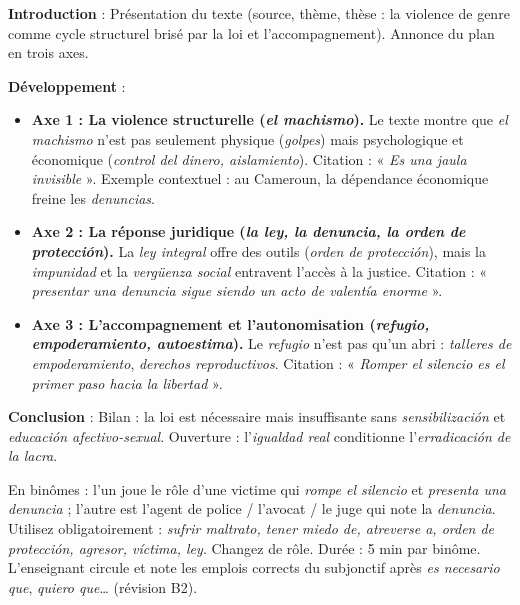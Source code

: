 \documentclass[11pt]{article}
\begin{document}
\begin{exemplebox}
\textbf{Introduction} : Présentation du texte (source, thème, thèse : la violence de genre comme cycle structurel brisé par la loi et l'accompagnement). Annonce du plan en trois axes.

\textbf{Développement} :
\begin{itemize}
\item \textbf{Axe 1 : La violence structurelle (\emph{el machismo}).} Le texte montre que \emph{el machismo} n'est pas seulement physique (\emph{golpes}) mais psychologique et économique (\emph{control del dinero, aislamiento}). Citation : « \emph{Es una jaula invisible} ». Exemple contextuel : au Cameroun, la dépendance économique freine les \emph{denuncias}.
\item \textbf{Axe 2 : La réponse juridique (\emph{la ley, la denuncia, la orden de protección}).} La \emph{ley integral} offre des outils (\emph{orden de protección}), mais la \emph{impunidad} et la \emph{vergüenza social} entravent l'accès à la justice. Citation : « \emph{presentar una denuncia sigue siendo un acto de valentía enorme} ».
\item \textbf{Axe 3 : L'accompagnement et l'autonomisation (\emph{refugio, empoderamiento, autoestima}).} Le \emph{refugio} n'est pas qu'un abri : \emph{talleres de empoderamiento}, \emph{derechos reproductivos}. Citation : « \emph{Romper el silencio es el primer paso hacia la libertad} ».
\end{itemize}

\textbf{Conclusion} : Bilan : la loi est nécessaire mais insuffisante sans \emph{sensibilización} et \emph{educación afectivo-sexual}. Ouverture : l'\emph{igualdad real} conditionne l'\emph{erradicación de la lacra}.
\end{exemplebox}

\begin{experience}
En binômes : l'un joue le rôle d'une victime qui \emph{rompe el silencio} et \emph{presenta una denuncia} ; l'autre est l'agent de police / l'avocat / le juge qui note la \emph{denuncia}. Utilisez obligatoirement : \emph{sufrir maltrato, tener miedo de, atreverse a, orden de protección, agresor, víctima, ley}. Changez de rôle. Durée : 5 min par binôme. L'enseignant circule et note les emplois corrects du subjonctif après \emph{es necesario que}, \emph{quiero que}… (révision B2).
\end{experience}
\end{document}
